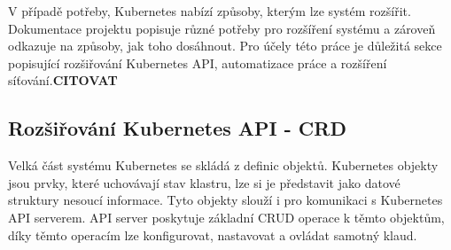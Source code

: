 V případě potřeby, Kubernetes nabízí způsoby, kterým lze systém rozšířit. Dokumentace projektu popisuje různé potřeby pro rozšíření systému a zároveň odkazuje na způsoby, jak toho dosáhnout. Pro účely této práce je důležitá sekce popisující rozšiřování Kubernetes API, automatizace práce a rozšíření síťování.\textbf{CITOVAT}





\subsection{Rozšiřování Kubernetes API - CRD}\label{CRD}
Velká část systému Kubernetes se skládá z definic objektů. Kubernetes objekty jsou prvky, které uchovávají stav klastru, lze si je představit jako datové struktury nesoucí informace. Tyto objekty slouží i pro komunikaci s Kubernetes API serverem. API server poskytuje základní CRUD operace k těmto objektům, díky těmto operacím lze konfigurovat, nastavovat a ovládat samotný klaud.

